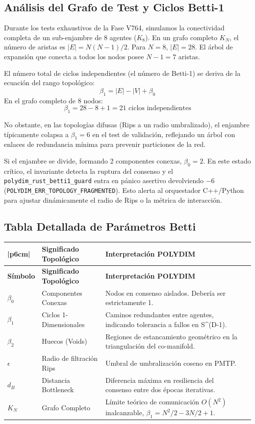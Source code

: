 \subsection{Análisis del Grafo de Test y Ciclos Betti-1}

Durante los tests exhaustivos de la Fase V764, simulamos la conectividad completa de un sub-enjambre de 8 agentes ($K_8$). En un grafo completo $K_N$, el número de aristas es $|E| = N(N-1)/2$. Para $N=8$, $|E| = 28$. El árbol de expansión que conecta a todos los nodos posee $N-1 = 7$ aristas. 

El número total de ciclos independientes (el número de Betti-1) se deriva de la ecuación del rango topológico:
$$ \beta_1 = |E| - |V| + \beta_0 $$
En el grafo completo de 8 nodos:
$$ \beta_1 = 28 - 8 + 1 = 21 \text{ ciclos independientes} $$

No obstante, en las topologías difusas (Rips a un radio umbralizado), el enjambre típicamente colapsa a $\beta_1 = 6$ en el test de validación, reflejando un árbol con enlaces de redundancia mínima para prevenir particiones de la red. 

Si el enjambre se divide, formando 2 componentes conexas, $\beta_0 = 2$. En este estado crítico, el invariante detecta la ruptura del consenso y el \texttt{polydim\_rust\_betti1\_guard} entra en pánico asertivo devolviendo $-6$ (\texttt{POLYDIM\_ERR\_TOPOLOGY\_FRAGMENTED}). Esto alerta al orquestador C++/Python para ajustar dinámicamente el radio de Rips o la métrica de interacción.

\subsection{Tabla Detallada de Parámetros Betti}
\begin{tabular}{llll}|p{6cm}|}
\hline
\textbf{Símbolo} & \textbf{Significado Topológico} & \textbf{Interpretación POLYDIM} \\
\hline
\endfirsthead
\hline
\textbf{Símbolo} & \textbf{Significado Topológico} & \textbf{Interpretación POLYDIM} \\
\hline
\endhead
$\beta_0$ & Componentes Conexas & Nodos en consenso aislados. Debería ser estrictamente 1. \\
\hline
$\beta_1$ & Ciclos 1-Dimensionales & Caminos redundantes entre agentes, indicando tolerancia a fallos en S^(D-1). \\
\hline
$\beta_2$ & Huecos (Voids) & Regiones de estancamiento geométrico en la triangulación del co-manifold. \\
\hline
$\epsilon$ & Radio de filtración Rips & Umbral de umbralización coseno en PMTP. \\
\hline
$d_B$ & Distancia Bottleneck & Diferencia máxima en resiliencia del consenso entre dos épocas iterativas. \\
\hline
$K_N$ & Grafo Completo & Límite teórico de comunicación $O(N^2)$ inalcanzable, $\beta_1 = N^2/2 - 3N/2 + 1$. \\
\hline
\end{tabular}


